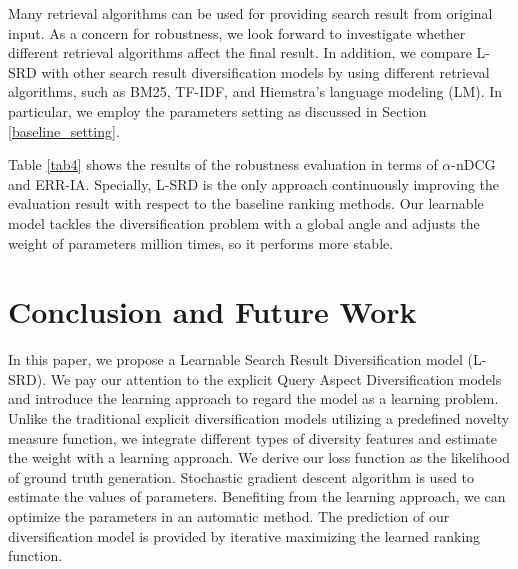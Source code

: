 \documentclass[review]{elsarticle}
\newcommand\revised[1]{{\color{black} #1}}
\begin{document}

\revised{
Many retrieval algorithms can be used for providing search result from original input. As a concern for robustness, we look forward to investigate whether different retrieval algorithms affect the final result. In addition, we compare L-SRD with other search result diversification models by using different retrieval algorithms, such as BM25, TF-IDF, and Hiemstra's language modeling (LM). In particular, we employ the parameters setting as discussed in Section \ref{baseline_setting}.} 

%

Table \ref{tab4} shows the results of the robustness evaluation in terms of $\alpha$-nDCG and ERR-IA. Specially, L-SRD is the only approach continuously improving the evaluation result with respect to the baseline ranking methods. Our learnable model tackles the diversification problem with a global angle and adjusts the weight of parameters million times, so it performs more stable.
\fi


\section{Conclusion and Future Work}\label{sec_con}
In this paper, we propose a Learnable Search Result Diversification model (L-SRD). We pay our attention to the explicit Query Aspect Diversification models and introduce the learning approach to regard the model as a learning problem. Unlike the traditional explicit diversification models utilizing a predefined novelty measure function, we integrate different types of diversity features and estimate the weight with a learning approach. We derive our loss function as the likelihood of ground truth generation. Stochastic gradient descent algorithm is used to estimate the values of parameters. Benefiting from the learning approach, we can optimize the parameters in an automatic method. The prediction of our diversification model is provided by iterative maximizing the learned ranking function.
\end{document}
